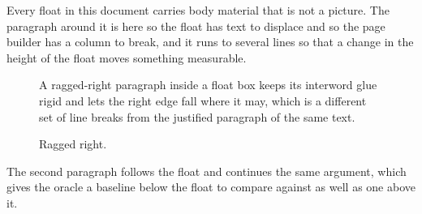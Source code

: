 \documentclass{article}
\begin{document}
Every float in this document carries body material that is not a
picture. The paragraph around it is here so the float has text to displace and
so the page builder has a column to break, and it runs to several lines so that
a change in the height of the float moves something measurable.

\begin{figure}[h]
\raggedright
A ragged-right paragraph inside a float box keeps its interword glue
rigid and lets the right edge fall where it may, which is a different set of
line breaks from the justified paragraph of the same text.
\caption{Ragged right.}
\end{figure}

The second paragraph follows the float and continues the same
argument, which gives the oracle a baseline below the float to compare against
as well as one above it.
\end{document}
